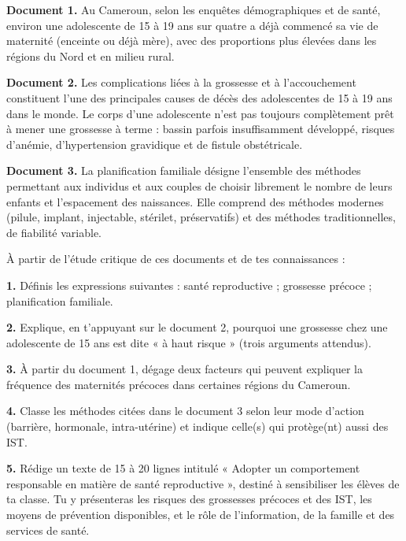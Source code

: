 \documentclass[11pt]{article}
\begin{document}
\begin{exercice}
\textbf{Document 1.} Au Cameroun, selon les enquêtes démographiques et de santé, environ une adolescente de 15 à 19 ans sur quatre a déjà commencé sa vie de maternité (enceinte ou déjà mère), avec des proportions plus élevées dans les régions du Nord et en milieu rural.

\textbf{Document 2.} Les complications liées à la grossesse et à l'accouchement constituent l'une des principales causes de décès des adolescentes de 15 à 19 ans dans le monde. Le corps d'une adolescente n'est pas toujours complètement prêt à mener une grossesse à terme : bassin parfois insuffisamment développé, risques d'anémie, d'hypertension gravidique et de fistule obstétricale.

\textbf{Document 3.} La planification familiale désigne l'ensemble des méthodes permettant aux individus et aux couples de choisir librement le nombre de leurs enfants et l'espacement des naissances. Elle comprend des méthodes modernes (pilule, implant, injectable, stérilet, préservatifs) et des méthodes traditionnelles, de fiabilité variable.

À partir de l'étude critique de ces documents et de tes connaissances :

\textbf{1.} Définis les expressions suivantes : santé reproductive ; grossesse précoce ; planification familiale.

\textbf{2.} Explique, en t'appuyant sur le document 2, pourquoi une grossesse chez une adolescente de 15 ans est dite « à haut risque » (trois arguments attendus).

\textbf{3.} À partir du document 1, dégage deux facteurs qui peuvent expliquer la fréquence des maternités précoces dans certaines régions du Cameroun.

\textbf{4.} Classe les méthodes citées dans le document 3 selon leur mode d'action (barrière, hormonale, intra-utérine) et indique celle(s) qui protège(nt) aussi des IST.

\textbf{5.} Rédige un texte de 15 à 20 lignes intitulé « Adopter un comportement responsable en matière de santé reproductive », destiné à sensibiliser les élèves de ta classe. Tu y présenteras les risques des grossesses précoces et des IST, les moyens de prévention disponibles, et le rôle de l'information, de la famille et des services de santé.
\end{exercice}

\newpage
\end{document}
